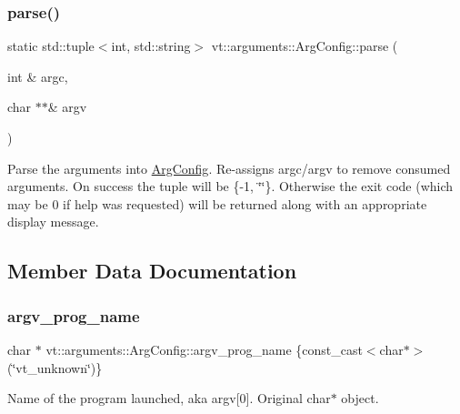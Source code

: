 \subsubsection{\texorpdfstring{parse()}{parse()}}
{\footnotesize\ttfamily static std\+::tuple$<$int, std\+::string$>$ vt\+::arguments\+::\+Arg\+Config\+::parse (\begin{DoxyParamCaption}\item[{int \&}]{argc,  }\item[{char $\ast$$\ast$\&}]{argv }\end{DoxyParamCaption})\hspace{0.3cm}{\ttfamily [static]}}

Parse the arguments into \hyperlink{structvt_1_1arguments_1_1_arg_config}{Arg\+Config}. Re-\/assigns argc/argv to remove consumed arguments. On success the tuple will be \{-\/1, \char`\"{}\char`\"{}\}. Otherwise the exit code (which may be 0 if help was requested) will be returned along with an appropriate display message. 

\subsection{Member Data Documentation}
\mbox{\label{structvt_1_1arguments_1_1_arg_config_aae77bdfe755eeaf6ea8d2f00dffc6077}} 
\subsubsection{\texorpdfstring{argv\+\_\+prog\+\_\+name}{argv\_prog\_name}}
{\footnotesize\ttfamily char $\ast$ vt\+::arguments\+::\+Arg\+Config\+::argv\+\_\+prog\+\_\+name \{const\+\_\+cast$<$char$\ast$$>$(\char`\"{}vt\+\_\+unknown\char`\"{})\}\hspace{0.3cm}{\ttfamily [static]}}

Name of the program launched, aka argv\mbox{[}0\mbox{]}. Original char$\ast$ object. \mbox{\label{structvt_1_1arguments_1_1_arg_config_a98e91ff747e85c52700f8ddb410fabb7}} 
